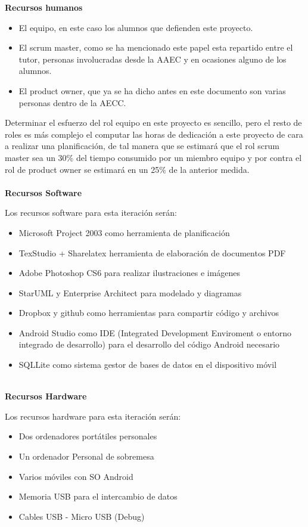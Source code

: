 \documentclass[../pfc.tex]{subfiles}
\begin{document}
	\textbf{Recursos humanos}
	
	\begin{itemize} 
		\item El equipo, en este caso los alumnos que defienden este proyecto. 
		\item El scrum master, como se ha mencionado este papel esta repartido entre el tutor, personas involucradas desde la AAEC y en ocasiones alguno de los alumnos. 
		\item El product owner, que ya se ha dicho antes en este documento son varias personas dentro de la AECC. 
	\end{itemize}
	
	Determinar el esfuerzo del rol equipo en este proyecto es sencillo, pero el resto de roles es más complejo el computar las horas de dedicación a este proyecto de cara a realizar una planificación, de tal manera que se estimará que el rol scrum master sea un 30\% del tiempo consumido por un miembro equipo y por contra el rol de product owner se estimará en un 25\% de la anterior medida.\\\\
	
	\textbf{Recursos Software}
	
	Los recursos software para esta iteración serán:
	\begin{itemize}
		\item Microsoft Project 2003 como herramienta de planificación
		\item TexStudio + Sharelatex herramienta de elaboración de documentos PDF
		\item Adobe Photoshop CS6 para realizar ilustraciones e imágenes
		\item StarUML y Enterprise Architect para modelado y diagramas
		\item Dropbox y github como herramientas para compartir código y archivos
		\item Android Studio como IDE (Integrated Development Enviroment o entorno integrado de desarrollo) para el desarrollo del código Android necesario
		\item SQLLite como sistema gestor de bases de datos en el dispositivo móvil\\\\
	\end{itemize}
	
	\textbf{Recursos Hardware}
	
	Los recursos hardware para esta iteración serán:
	
	\begin{itemize}
		\item Dos ordenadores portátiles personales
		\item Un ordenador Personal de sobremesa
		\item Varios móviles con SO Android
		\item Memoria USB para el intercambio de datos
		\item Cables USB - Micro USB (Debug)
	\end{itemize}	
	
\end{document}
